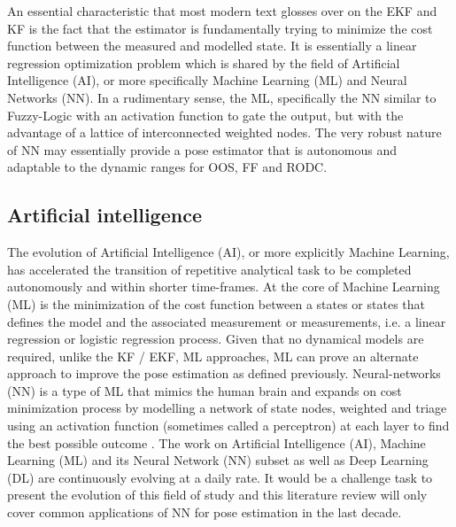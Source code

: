 
An essential characteristic that most modern text glosses over on the EKF and KF is the fact that the estimator is fundamentally trying to minimize the cost function between the measured and modelled state. It is essentially a linear regression optimization problem which is shared by the field of Artificial Intelligence (AI), or more specifically Machine Learning (ML) and Neural Networks (NN). In a rudimentary sense, the ML, specifically the NN similar to Fuzzy-Logic with an activation function to gate the output, but with the advantage of a lattice of interconnected weighted nodes. The very robust nature of NN may essentially provide a pose estimator that is autonomous and adaptable to the dynamic ranges for OOS, FF and RODC. 

\subsection{Artificial intelligence}\label{CHAP1_3_2}
The evolution of Artificial Intelligence (AI), or more explicitly Machine Learning, has accelerated the transition of repetitive analytical task to be completed autonomously and within shorter time-frames. At the core of Machine Learning (ML) is the minimization of the cost function between a states or states that defines the model and the associated measurement or measurements, i.e. a linear regression or logistic regression process. Given that no dynamical models are required, unlike the KF / EKF, ML approaches, ML can prove an alternate approach to improve the pose estimation as defined previously. Neural-networks (NN) is a type of ML that mimics the human brain and expands on cost minimization process by modelling a network of state nodes, weighted and triage using an activation function (sometimes called a perceptron) at each layer to find the best possible outcome \cite{yangML21}. The work on Artificial Intelligence (AI), Machine Learning (ML) and its Neural Network (NN) subset as well as Deep Learning (DL) are continuously evolving at a daily rate. It would be a challenge task to present the evolution of this field of study and this literature review will only cover common applications of NN for pose estimation in the last decade. 

